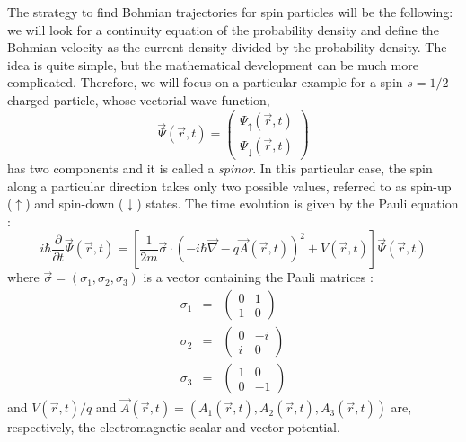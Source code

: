 \documentclass[nofootinbib, secnumarabic, amsmath, nobibnotes,11pt,aps,pra, floatfix]{revtex4-1}
\begin{document}
The strategy to find Bohmian trajectories for spin particles will be the following: we will look for a continuity equation of the probability density and define the Bohmian velocity as the current density divided by the probability density.
The idea is quite simple, but the mathematical development can be much more complicated. Therefore, we will focus on a particular example for a spin $s = 1/2$ charged particle, whose vectorial wave function,
\begin{equation}
\vec \Psi(\vec r,t) = \left(
\begin{array}{c}
\Psi_{\uparrow}(\vec r,t) \\ \Psi_{\downarrow}(\vec r,t)
\end{array}
\right)
\end{equation}
has two components and it is called a \textit{spinor}. In this particular case, the spin along a particular direction takes only two possible values, referred to as spin-up ($\uparrow$) and spin-down ($\downarrow$) states.
The time evolution is given by the Pauli equation \cite{om.ward}:
\begin{equation}
\label{om.pauli}
i \hbar \frac{ \partial}{\partial t} \vec \Psi(\vec r,t) =
\left[ \frac{1}{2m} \vec{\sigma} \cdot \left(- i \hbar \vec{\nabla} - q \vec{A} (\vec r,t) \right) ^2 + V(\vec r,t) \right]
\vec \Psi(\vec r,t)
\end{equation}
where $\vec{\sigma} = (\sigma_1, \sigma_2, \sigma_3)$ is a vector containing the Pauli matrices \cite{om.landaulif}:
\begin{eqnarray}
\sigma_1 & = & \begin{pmatrix} 0&1 \\ 1&0 \end{pmatrix}  \\
\sigma_2 & = & \begin{pmatrix} 0&-i \\ i&0 \end{pmatrix} \\
\sigma_3 & = & \begin{pmatrix} 1&0 \\ 0&-1 \end{pmatrix}
\end{eqnarray}
and $V(\vec r,t)/q$ and $\vec{A}(\vec r,t) = (A_1(\vec r,t),A_2(\vec r,t),A_3(\vec r,t))$ are, respectively, the electromagnetic scalar and vector potential.
\end{document}
